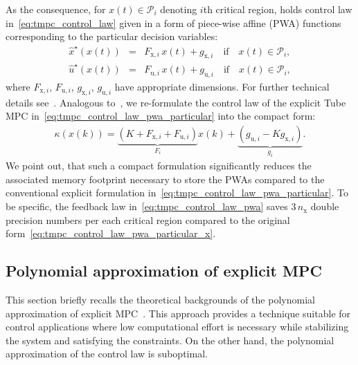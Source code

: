 \documentclass[letterpaper, 10 pt, conference]{ieeeconf}
\begin{document}
	As the consequence, for $x(t) \in \mathcal{P}_{i}$ denoting $i$th critical region, holds control law in~\eqref{eq:tmpc_control_law} given in a form of
	piece-wise affine (PWA) functions corresponding to the particular decision variables:
	\begin{subequations}
		\label{eq:tmpc_control_law_pwa_particular}
		\begin{eqnarray}
			\label{eq:tmpc_control_law_pwa_particular_x}
			\hat{x}^{\star}(x(t)) \!\!\!\!&=&\!\!\!\! F_{\mathrm{x},i} \, x(t) + g_{\mathrm{x},i} \quad \text{if} \quad x(t) \in \mathcal{P}_{i}, \\
			\label{eq:tmpc_control_law_pwa_particular_u}
			\hat{u}^{\star}(x(t)) \!\!\!\!&=&\!\!\!\! F_{\mathrm{u},i} \, x(t) + g_{\mathrm{u},i} \quad \text{if} \quad x(t) \in \mathcal{P}_{i},
		\end{eqnarray}
	\end{subequations}
	where $F_{\mathrm{x},i}$, $F_{\mathrm{u},i}$, $g_{\mathrm{x},i}$, $g_{\mathrm{u},i}$ have appropriate dimensions. For further technical details see~\cite{BM02}. 
	Analogous to~\cite{ZT14}, we re-formulate the control law of the explicit Tube MPC in~\eqref{eq:tmpc_control_law_pwa_particular} into the compact form:
	\begin{eqnarray}
		\label{eq:tmpc_control_law_pwa}
		\kappa(x(k)) = \underbrace{ \left( K + F_{\mathrm{x},i} + F_{\mathrm{u},i} \right) }_{ F_{i} } x(k) + \underbrace{ \left( g_{\mathrm{u},i} - K g_{\mathrm{x},i} \right) }_{ g_{i} }.
	\end{eqnarray}
	We point out, that such a compact formulation significantly reduces the associated memory footprint necessary to store the PWAs compared to the conventional explicit formulation in~\eqref{eq:tmpc_control_law_pwa_particular}.  
	To be specific, the feedback law in~\eqref{eq:tmpc_control_law_pwa} saves $3\,n_\text{x}$ double precision numbers per each critical region compared to the original form~\eqref{eq:tmpc_control_law_pwa_particular_x}.
	
	\subsection{Polynomial approximation of explicit MPC}
	\label{sec:polynomial}
	This section briefly recalls the theoretical backgrounds of the polynomial approximation of explicit MPC~\cite{kvasnica_polynomial}. This approach provides a technique suitable for control applications where low computational effort is necessary while stabilizing the system and satisfying the constraints. On the other hand, the polynomial approximation of the control law is suboptimal. 
	
\end{document}
